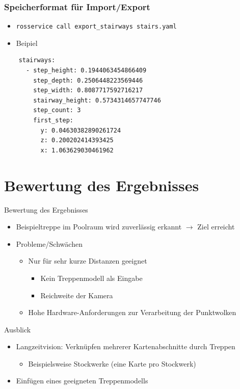 \documentclass[18pt]{beamer}
\begin{document}
\begin{frame}[fragile]
\frametitle{Speicherformat für Import/Export}
\begin{itemize}
	\item \texttt{rosservice call export\_stairways stairs.yaml}
	\item Beipiel
\end{itemize}
\begin{center}
	\begin{lstlisting}
	stairways:
	  - step_height: 0.1944063454866409
	    step_depth: 0.2506448223569446
	    step_width: 0.8087717592716217
	    stairway_height: 0.5734314657747746
	    step_count: 3
	    first_step:
	      y: 0.04630382890261724
	      z: 0.200202414393425
	      x: 1.063629030461962

	\end{lstlisting}
\end{center}
\end{frame}



\section{Bewertung des Ergebnisses}

\begin{frame}{Bewertung des Ergebnisses}
\begin{itemize}
	\item Beispieltreppe im Poolraum wird zuverlässig erkannt \(\longrightarrow\) Ziel erreicht
	\item Probleme/Schwächen
	\begin{itemize}
		\item Nur für sehr kurze Distanzen geeignet
		\begin{itemize}
			\item Kein Treppenmodell als Eingabe
			\item Reichweite der Kamera
		\end{itemize}
		\item Hohe Hardware-Anforderungen zur Verarbeitung der Punktwolken
	\end{itemize}
\end{itemize}
\end{frame}

\begin{frame}{Ausblick}
\begin{itemize}
	\item Langzeitvision: Verknüpfen mehrerer Kartenabschnitte durch Treppen
	\begin{itemize}
		\item Beispielsweise Stockwerke (eine Karte pro Stockwerk)
	\end{itemize}
	\item Einfügen eines geeigneten Treppenmodells
\end{itemize}
\end{frame}
\end{document}
